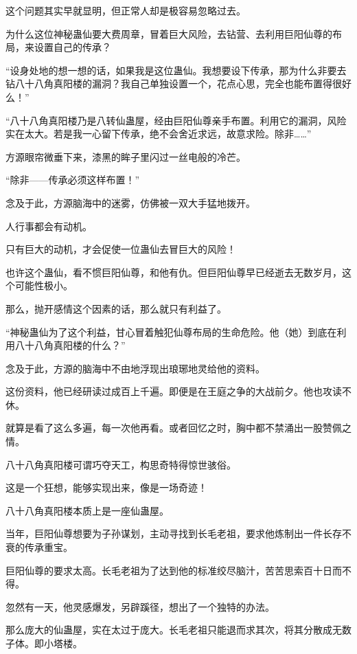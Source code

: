 
\begin{this_body}

这个问题其实早就显明，但正常人却是极容易忽略过去。

为什么这位神秘蛊仙要大费周章，冒着巨大风险，去钻营、去利用巨阳仙尊的布局，来设置自己的传承？

“设身处地的想一想的话，如果我是这位蛊仙。我想要设下传承，那为什么非要去钻八十八角真阳楼的漏洞？我自己单独设置一个，花点心思，完全也能布置得很好么！”

“八十八角真阳楼乃是八转仙蛊屋，经由巨阳仙尊亲手布置。利用它的漏洞，风险实在太大。若是我一心留下传承，绝不会舍近求远，故意求险。除非……”

方源眼帘微垂下来，漆黑的眸子里闪过一丝电般的冷芒。

“除非——传承必须这样布置！”

念及于此，方源脑海中的迷雾，仿佛被一双大手猛地拨开。

人行事都会有动机。

只有巨大的动机，才会促使一位蛊仙去冒巨大的风险！

也许这个蛊仙，看不惯巨阳仙尊，和他有仇。但巨阳仙尊早已经逝去无数岁月，这个可能性极小。

那么，抛开感情这个因素的话，那么就只有利益了。

“神秘蛊仙为了这个利益，甘心冒着触犯仙尊布局的生命危险。他（她）到底在利用八十八角真阳楼的什么？”

念及于此，方源的脑海中不由地浮现出琅琊地灵给他的资料。

这份资料，他已经研读过成百上千遍。即便是在王庭之争的大战前夕。他也攻读不休。

就算是看了这么多遍，每一次他再看。或者回忆之时，胸中都不禁涌出一股赞佩之情。

八十八角真阳楼可谓巧夺天工，构思奇特得惊世骇俗。

这是一个狂想，能够实现出来，像是一场奇迹！

八十八角真阳楼本质上是一座仙蛊屋。

当年，巨阳仙尊想要为子孙谋划，主动寻找到长毛老祖，要求他炼制出一件长存不衰的传承重宝。

巨阳仙尊的要求太高。长毛老祖为了达到他的标准绞尽脑汁，苦苦思索百十日而不得。

忽然有一天，他灵感爆发，另辟蹊径，想出了一个独特的办法。

那么庞大的仙蛊屋，实在太过于庞大。长毛老祖只能退而求其次，将其分散成无数子体。即小塔楼。


\end{this_body}
